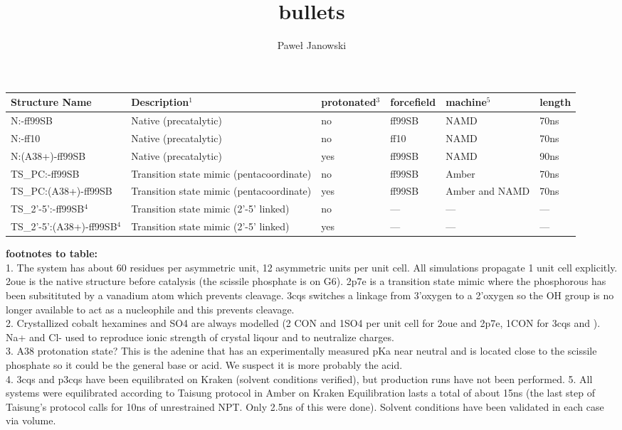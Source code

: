 \documentclass[11pt,letterpaper]{report}
\author{Pawe\l{} Janowski}
\title{bullets}
\newcommand{\sups}[1]{\ensuremath{^{\textrm{#1}}}}
\begin{document}
\begin{adjustwidth}{-1in}{-0in}
\begin{tabular}{| l | p{5cm} | l | l | p{2cm} | l |}
\hline
Structure Name & Description\sups{1}                     & protonated\sups{3} & forcefield &machine\sups{5} &length \\ \hline
N:-ff99SB     & Native (precatalytic)                   & no                 & ff99SB     &NAMD            & 70ns \\ \hline
N:-ff10     & Native (precatalytic)                   & no                 & ff10       &NAMD            & 70ns \\ \hline
N:(A38+)-ff99SB          & Native (precatalytic)                   & yes                & ff99SB     &NAMD            & 90ns \\ \hline
TS\_{PC}:-ff99SB           & Transition state mimic (pentacoordinate)& no                 & ff99SB     &Amber           & 70ns \\ \hline
TS\_{PC}:(A38+)-ff99SB          & Transition state mimic (pentacoordinate)& yes                & ff99SB     &Amber and NAMD  & 70ns \\ \hline
TS\_{2'-5'}:-ff99SB\sups{4}   & Transition state mimic (2'-5' linked)   & no                 & ---        &---             & --- \\ \hline
TS\_{2'-5'}:(A38+)-ff99SB\sups{4}  & Transition state mimic (2'-5' linked)   & yes                & ---        &---             & --- \\ \hline
\end{tabular}

\par\vspace{5mm}
\textbf{footnotes to table:}\\
1. The system has about 60 residues per asymmetric unit, 12 asymmetric units per unit cell. All simulations propagate 1 unit cell explicitly. 2oue is the native structure before catalysis (the scissile phosphate is on G6). 2p7e is a transition state mimic where the phosphorous has been subsitituted by a vanadium atom which prevents cleavage. 3cqs switches a linkage from 3'oxygen to a 2'oxygen so the OH group is no longer available to act as a nucleophile and this prevents cleavage. \\
2. Crystallized cobalt hexamines and SO4 are always modelled (2 CON and 1SO4 per unit cell for 2oue and 2p7e, 1CON for 3cqs and ). Na+ and Cl- used to reproduce ionic strength of crystal liqour and to neutralize charges.\\
3. A38 protonation state? This is the adenine that has an experimentally measured pKa near neutral and is located close to the scissile phosphate so it could be the general base or acid. We suspect it is more probably the acid. \\
4. 3cqs and p3cqs have been equilibrated on Kraken (solvent conditions verified), but production runs have not been performed.
5. All systems were equilibrated according to Taisung protocol in Amber on Kraken Equilibration lasts a total of about 15ns (the last step of Taisung's protocol calls for 10ns of unrestrained NPT. Only 2.5ns of this were done). Solvent conditions have been validated in each case via volume.
\end{adjustwidth}
\end{document}
